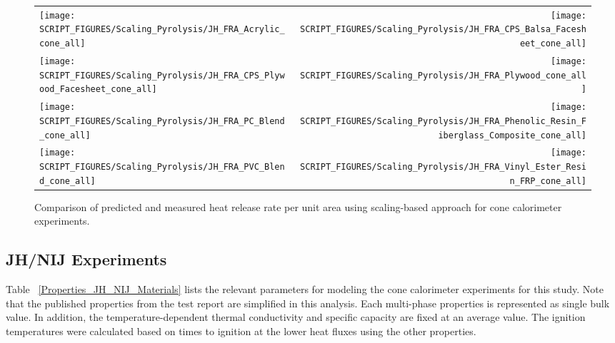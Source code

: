 \begin{figure}[p]
\begin{tabular*}{\textwidth}{l@{\extracolsep{\fill}}r}
\texttt{[image: SCRIPT\_FIGURES/Scaling\_Pyrolysis/JH\_FRA\_Acrylic\_cone\_all]} &
\texttt{[image: SCRIPT\_FIGURES/Scaling\_Pyrolysis/JH\_FRA\_CPS\_Balsa\_Facesheet\_cone\_all]} \\
\texttt{[image: SCRIPT\_FIGURES/Scaling\_Pyrolysis/JH\_FRA\_CPS\_Plywood\_Facesheet\_cone\_all]} &
\texttt{[image: SCRIPT\_FIGURES/Scaling\_Pyrolysis/JH\_FRA\_Plywood\_cone\_all]} \\
\texttt{[image: SCRIPT\_FIGURES/Scaling\_Pyrolysis/JH\_FRA\_PC\_Blend\_cone\_all]} &
\texttt{[image: SCRIPT\_FIGURES/Scaling\_Pyrolysis/JH\_FRA\_Phenolic\_Resin\_Fiberglass\_Composite\_cone\_all]} \\
\texttt{[image: SCRIPT\_FIGURES/Scaling\_Pyrolysis/JH\_FRA\_PVC\_Blend\_cone\_all]} &
\texttt{[image: SCRIPT\_FIGURES/Scaling\_Pyrolysis/JH\_FRA\_Vinyl\_Ester\_Resin\_FRP\_cone\_all]} \\
\end{tabular*}
\caption[HRRPUA of JH/FRA materials using scaling model]
{Comparison of predicted and measured heat release rate per unit area using scaling-based approach for cone calorimeter experiments.}
\label{JH_FRA_HRR_materials}
\end{figure}

\clearpage

\subsection{JH/NIJ Experiments}\label{sec_JH_NIJ_Materials}

Table ~\ref{Properties_JH_NIJ_Materials} lists the relevant parameters for modeling the cone calorimeter experiments for this study.
Note that the published properties from the test report are simplified in this analysis. Each multi-phase properties is represented as single bulk value.
In addition, the temperature-dependent thermal conductivity and specific capacity are fixed at an average value.
The ignition temperatures were calculated based on times to ignition at the lower heat fluxes using the other properties.

